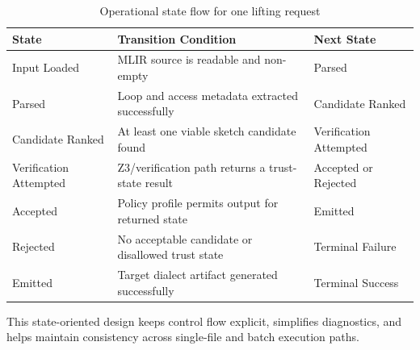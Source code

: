\begin{table}[H]
\centering
\caption{Operational state flow for one lifting request}
\begin{tabular}{|p{3.2cm}|p{5.0cm}|p{6.8cm}|}
\hline
\textbf{State} & \textbf{Transition Condition} & \textbf{Next State} \\
\hline
Input Loaded & MLIR source is readable and non-empty & Parsed \\
\hline
Parsed & Loop and access metadata extracted successfully & Candidate Ranked \\
\hline
Candidate Ranked & At least one viable sketch candidate found & Verification Attempted \\
\hline
Verification Attempted & Z3/verification path returns a trust-state result & Accepted or Rejected \\
\hline
Accepted & Policy profile permits output for returned state & Emitted \\
\hline
Rejected & No acceptable candidate or disallowed trust state & Terminal Failure \\
\hline
Emitted & Target dialect artifact generated successfully & Terminal Success \\
\hline
\end{tabular}
\end{table}

This state-oriented design keeps control flow explicit, simplifies diagnostics, and helps maintain consistency across single-file and batch execution paths.
